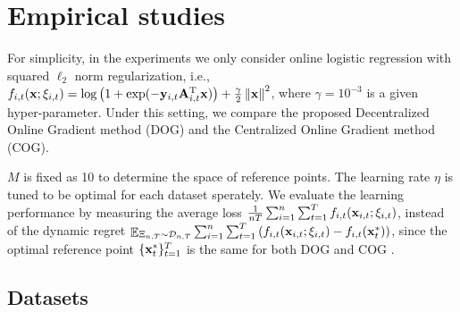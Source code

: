 \documentclass{article}
\begin{document}
{%



}

\section{Empirical studies}


For simplicity, in the experiments we only consider online logistic regression with squared $\ell_2$ norm regularization, i.e., $f_{i,t}({\bf x};\xi_{i,t}) = \log\left( 1+\exp(-{\bf y}_{i,t}{\bf A}_{i,t}^{\rm T} {\bf x}) \right) + \frac{\gamma}{2}\left\lVert{\bf x}\right\rVert^2$, where $\gamma = 10^{-3}$ is a given hyper-parameter. Under this setting, we compare the proposed Decentralized Online Gradient method (DOG) and the Centralized Online Gradient method (COG). 

$M$ is fixed as 10 to determine the space of reference points. The learning rate $\eta$ is tuned to be optimal for each dataset sperately. We evaluate the learning performance by measuring the average loss $\frac{1}{nT}\sum_{i=1}^n\sum_{t=1}^T f_{i,t}({\bf x}_{i,t};\xi_{i,t})$, instead of the dynamic regret $\mathop{\mathbb{E}}_{\Xi_{n,T}\sim \mathcal{D}_{n,T}}\sum_{i=1}^n\sum_{t=1}^T \left(  f_{i,t}({\bf x}_{i,t};\xi_{i,t}) - f_{i,t}({\bf x}_t^{\ast})  \right)$, since the optimal reference point $\{{\bf x}_t^\ast\}^T_{t=1}$ is the same for both DOG and COG .  

\subsection{Datasets}
\end{document}
